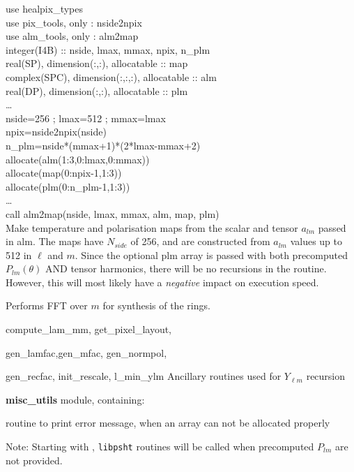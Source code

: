 \begin{example}
{
use healpix\_types \\
use pix\_tools, only : nside2npix \\
use alm\_tools, only : alm2map \\
integer(I4B) :: nside, lmax, mmax, npix, n\_plm\\
real(SP), dimension(:,:), allocatable :: map \\
complex(SPC), dimension(:,:,:), allocatable :: alm \\
real(DP), dimension(:,:), allocatable :: plm \\
\ldots \\
nside=256 ; lmax=512 ; mmax=lmax\\
npix=nside2npix(nside)\\
n\_plm=nside*(mmax+1)*(2*lmax-mmax+2)\\
allocate(alm(1:3,0:lmax,0:mmax))\\
allocate(map(0:npix-1,1:3))\\
allocate(plm(0:n\_plm-1,1:3))\\
\ldots \\
call alm2map(nside, lmax, mmax, alm, map, plm)  \\
}
{
Make temperature and polarisation maps from the scalar and tensor $a_{lm}$
passed in alm. The maps have $N_{side}$ of 256, and are constructed from
$a_{lm}$ values up to 512 in $\ell$ and $m$. Since the optional plm array is
passed with both precomputed $P_{lm}(\theta)$ AND tensor harmonics, there will
be no recursions in the routine. However, this will most likely have a
\emph{negative} impact on execution speed.
}
\end{example}

\begin{modules}
  \begin{sulist}{} %
  \item[\htmlref{ring\_synthesis}{sub:ring_synthesis}] Performs FFT over $m$ for synthesis of the rings.
  \item[compute\_lam\_mm, get\_pixel\_layout, ]
  \item[gen\_lamfac,gen\_mfac, gen\_normpol, ] 
  \item[gen\_recfac, init\_rescale, l\_min\_ylm] Ancillary routines used
  for $Y_{\ell m}$ recursion
  \item[\textbf{misc\_utils}] module, containing:
  \item[\htmlref{assert\_alloc}{sub:assert}] routine to print error message, when an array can not be
  allocated properly
  \end{sulist}
Note: Starting with , {\tt libpsht} routines will be called when
precomputed $P_{lm}$ are not provided.
\end{modules}

